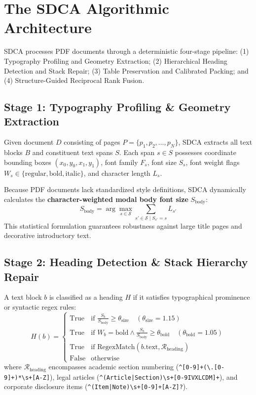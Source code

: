 \documentclass[conference]{IEEEtran}
\begin{document}
\section{The SDCA Algorithmic Architecture}

SDCA processes PDF documents through a deterministic four-stage pipeline: (1) Typography Profiling and Geometry Extraction; (2) Hierarchical Heading Detection and Stack Repair; (3) Table Preservation and Calibrated Packing; and (4) Structure-Guided Reciprocal Rank Fusion.

\subsection{Stage 1: Typography Profiling \& Geometry Extraction}
Given document $D$ consisting of pages $P = \{p_1, p_2, \dots, p_N\}$, SDCA extracts all text blocks $B$ and constituent text spans $S$. Each span $s \in S$ possesses coordinate bounding boxes $(x_0, y_0, x_1, y_1)$, font family $F_s$, font size $S_s$, font weight flags $W_s \in \{\text{regular}, \text{bold}, \text{italic}\}$, and character length $L_s$. 

Because PDF documents lack standardized style definitions, SDCA dynamically calculates the \textbf{character-weighted modal body font size} $S_{\text{body}}$:
\begin{equation}
S_{\text{body}} = \arg\max_{s \in \mathcal{S}} \sum_{s' \in \mathcal{S} \mid S_{s'} = s} L_{s'}
\end{equation}
This statistical formulation guarantees robustness against large title pages and decorative introductory text.

\subsection{Stage 2: Heading Detection \& Stack Hierarchy Repair}
A text block $b$ is classified as a heading $H$ if it satisfies typographical prominence or syntactic regex rules:
\begin{equation}
H(b) = \begin{cases} 
\text{True} & \text{if } \frac{S_b}{S_{\text{body}}} \ge \theta_{\text{size}} \quad (\theta_{\text{size}} = 1.15) \\
\text{True} & \text{if } W_b = \text{bold} \land \frac{S_b}{S_{\text{body}}} \ge \theta_{\text{bold}} \quad (\theta_{\text{bold}} = 1.05) \\
\text{True} & \text{if } \text{RegexMatch}(b.\text{text}, \mathcal{R}_{\text{heading}}) \\
\text{False} & \text{otherwise}
\end{cases}
\end{equation}
where $\mathcal{R}_{\text{heading}}$ encompasses academic section numbering (\texttt{\^{}[0-9]+(\textbackslash.[0-9]+)*\textbackslash s+[A-Z]}), legal articles (\texttt{\^{}(Article|Section)\textbackslash s+[0-9IVXLCDM]+}), and corporate disclosure items (\texttt{\^{}(Item|Note)\textbackslash s+[0-9]+[A-Z]?}).
\end{document}
